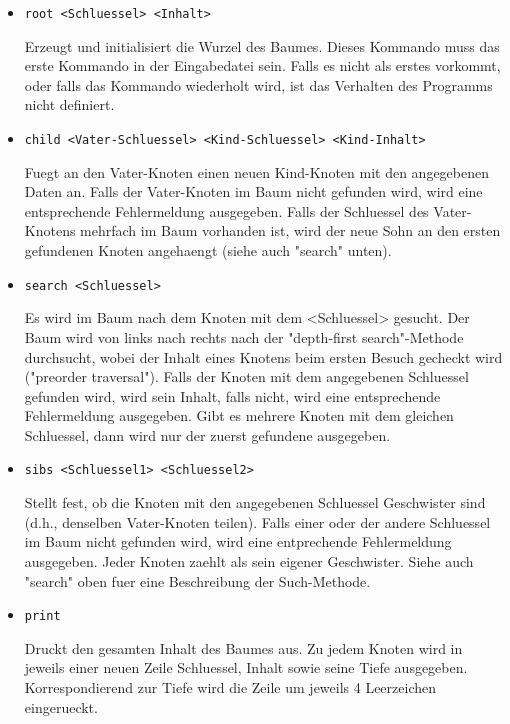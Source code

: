 \begin{itemize}

\item {\tt root <Schluessel> <Inhalt>}

Erzeugt und initialisiert die Wurzel des Baumes.
Dieses Kommando muss das erste Kommando in der Eingabedatei sein.
Falls es nicht als erstes vorkommt, oder falls das Kommando wiederholt
wird, ist das Verhalten des Programms nicht definiert.

\item {\tt child <Vater-Schluessel> <Kind-Schluessel> <Kind-Inhalt>}

Fuegt an den Vater-Knoten einen neuen Kind-Knoten 
mit den angegebenen Daten an.
Falls der Vater-Knoten im Baum nicht gefunden wird, wird eine
entsprechende Fehlermeldung ausgegeben.
Falls der Schluessel des Vater-Knotens mehrfach im Baum vorhanden
ist, wird der neue Sohn an den ersten gefundenen Knoten angehaengt
(siehe auch "search" unten).

\item {\tt search <Schluessel>}

Es wird im Baum nach dem Knoten mit dem <Schluessel> gesucht.
Der Baum wird von links nach rechts nach der "depth-first
search"-Methode durchsucht, wobei der Inhalt eines Knotens beim ersten
Besuch gecheckt wird ("preorder traversal").
Falls der Knoten mit dem angegebenen Schluessel gefunden wird, wird
sein Inhalt, falls nicht, wird eine entsprechende Fehlermeldung
ausgegeben.  Gibt es mehrere Knoten mit dem gleichen Schluessel, dann
wird nur der zuerst gefundene ausgegeben.  

\item {\tt sibs <Schluessel1> <Schluessel2>}

Stellt fest, ob die Knoten mit den angegebenen Schluessel Geschwister
sind (d.h., denselben Vater-Knoten teilen).  Falls einer oder der
andere Schluessel im Baum nicht gefunden wird, wird eine entprechende
Fehlermeldung ausgegeben.  Jeder Knoten zaehlt als sein eigener
Geschwister. 
Siehe auch "search" oben fuer eine Beschreibung der Such-Methode.

\item {\tt print}

Druckt den gesamten Inhalt des Baumes aus. Zu jedem Knoten wird in 
jeweils einer neuen Zeile Schluessel, Inhalt sowie seine Tiefe
ausgegeben. Korrespondierend zur Tiefe wird die Zeile um jeweils
4 Leerzeichen eingerueckt.

\end{itemize}

